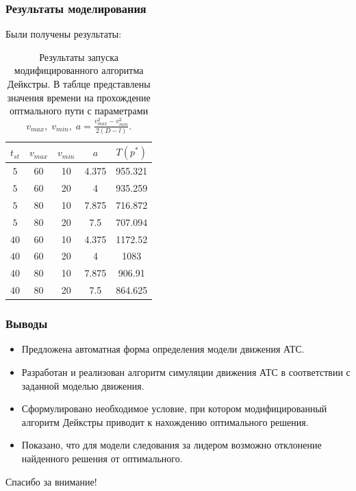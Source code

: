 \documentclass{beamer}
\begin{document}
\begin{frame}\frametitle{Результаты моделирования}
	Были получены результаты:
	\begin{table}[H]
		\label{tab:res_average}
		\centering
		\begin{tabular}{|c|c|c|c|c|}
			\hline
			\multicolumn{1}{|c|}{ $t_{st}$} & $v_{max}$  & $v_{min}$ & $a$ &  $T(p^*)$ \\ \hline
			\multicolumn{1}{|c|}{$5$}       & 60         & 10        & 4.375 &   955.321         \\ \hline
			\multicolumn{1}{|c|}{$5$}       & 60         & 20        &  4   &     935.259        \\ \hline
			\multicolumn{1}{|c|}{$5$ }      & 80         & 10        &  7.875   &    716.872         \\ \hline
			\multicolumn{1}{|c|}{$5$}       & 80 & 20                  & 7.5 &        707.094           \\ \hline
			\multicolumn{1}{|c|}{$40$}      & 60 & 10                  & 4.375    &  1172.52            \\ \hline
			\multicolumn{1}{|c|}{$40$ }     & 60 & 20                  & 4   &       1083       \\ \hline
			\multicolumn{1}{|c|}{$40$}      & 80 & 10                  & 7.875    &    906.91          \\ \hline
			\multicolumn{1}{|c|}{$40$ }     & 80 & 20                  & 7.5   &       864.625       \\ \hline
			
		\end{tabular}
		\caption{Результаты запуска модифицированного алгоритма Дейкстры. В таблце представлены значения времени на прохождение оптмального пути с параметрами $v_{max}, \; v_{min}, \; a = \frac{v^2_{max}-v^2_{min}}{2(D-l)}$.}
	\end{table}
\end{frame}


\begin{frame}\frametitle{Выводы}
  \begin{itemize}
  \item Предложена автоматная форма определения модели движения АТС.
  \item Разработан и реализован алгоритм симуляции движения АТС в соответствии с заданной моделью движения.
  \item Сформулировано необходимое условие, при котором модифицированный алгоритм Дейкстры приводит к нахождению оптимального решения.
  \item Показано, что для модели следования за лидером возможно отклонение найденного решения от оптимального.
  \end{itemize}
\end{frame}


\begin{frame}[standout]
Спасибо за внимание!
\end{frame}
\end{document}
